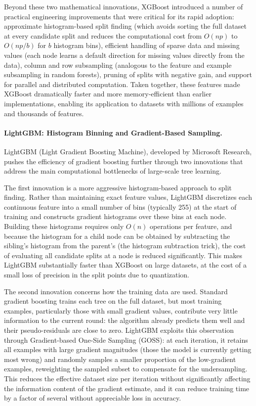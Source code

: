 Beyond these two mathematical innovations, XGBoost introduced a number of practical engineering improvements that were critical for its rapid adoption: approximate histogram-based split finding (which avoids sorting the full dataset at every candidate split and reduces the computational cost from $O(n p)$ to $O(n p / b)$ for $b$ histogram bins), efficient handling of sparse data and missing values (each node learns a default direction for missing values directly from the data), column and row subsampling (analogous to the feature and example subsampling in random forests), pruning of splits with negative gain, and support for parallel and distributed computation. Taken together, these features made XGBoost dramatically faster and more memory-efficient than earlier implementations, enabling its application to datasets with millions of examples and thousands of features.

\paragraph{LightGBM: Histogram Binning and Gradient-Based Sampling.}
LightGBM (Light Gradient Boosting Machine), developed by Microsoft Research, pushes the efficiency of gradient boosting further through two innovations that address the main computational bottlenecks of large-scale tree learning.

The first innovation is a more aggressive histogram-based approach to split finding. Rather than maintaining exact feature values, LightGBM discretizes each continuous feature into a small number of bins (typically 255) at the start of training and constructs gradient histograms over these bins at each node. Building these histograms requires only $O(n)$ operations per feature, and because the histogram for a child node can be obtained by subtracting the sibling's histogram from the parent's (the histogram subtraction trick), the cost of evaluating all candidate splits at a node is reduced significantly. This makes LightGBM substantially faster than XGBoost on large datasets, at the cost of a small loss of precision in the split points due to quantization.

The second innovation concerns how the training data are used. Standard gradient boosting trains each tree on the full dataset, but most training examples, particularly those with small gradient values, contribute very little information to the current round: the algorithm already predicts them well and their pseudo-residuals are close to zero. LightGBM exploits this observation through Gradient-based One-Side Sampling (GOSS): at each iteration, it retains all examples with large gradient magnitudes (those the model is currently getting most wrong) and randomly samples a smaller proportion of the low-gradient examples, reweighting the sampled subset to compensate for the undersampling. This reduces the effective dataset size per iteration without significantly affecting the information content of the gradient estimate, and it can reduce training time by a factor of several without appreciable loss in accuracy.

